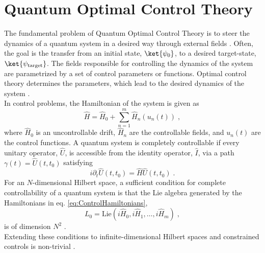 \chapter{Quantum Optimal Control Theory}
The fundamental problem of Quantum Optimal Control Theory is to steer the dynamics of a quantum system in a desired way through external fields \cite{Rice2000,Shapiro2003}. Often, the goal is the transfer from an initial state, $\ket{\psi_0}$, to a desired target-state, $\ket{\psi_{\mathrm{target}}}$. The fields responsible for controlling the dynamics of the system are parametrized by a set of control parameters or functions. Optimal control theory determines the parameters, which lead to the desired dynamics of the system \cite{Werschnik2007}.\\ 
In control problems, the Hamiltonian of the system is given as
\begin{equation}
	\hat{H} =  \hat{H}_0 + \sum_{n = 1}^{m}  \hat{H}_n (u_n(t)) \; ,
	\label{eq:ControlHamiltonians}
\end{equation} 
where $\hat{H}_0$ is an uncontrollable drift, $\hat{H}_n$ are the controllable fields, and $u_n(t)$ are the control functions. A quantum system is completely controllable if every unitary operator, $\hat{U}$, is accessible from the identity operator, $\hat{I}$, via a path $\gamma (t) = \hat{U}(t, t_0)$ satisfying \cite{Schirmer2001}
\begin{equation}
	i \partial_t \hat{U}(t, t_0) = \hat{H} \hat{U}(t, t_0) \; .
\end{equation} 
For an $N$-dimensional Hilbert space, a sufficient condition for complete controllability of a quantum system is that the Lie algebra generated by the Hamiltonians in eq. \eqref{eq:ControlHamiltonians},
\begin{equation}
	L_0 = \mathrm{Lie} \left( i \hat{H}_0, i \hat{H}_1 , \ldots , i \hat{H}_m \right) \; ,
\end{equation}
is of dimension $N^2$ \cite{Ramakrishna1995}.\\
Extending these conditions to infinite-dimensional Hilbert spaces and constrained controls is non-trivial \cite{Huang1983}.


